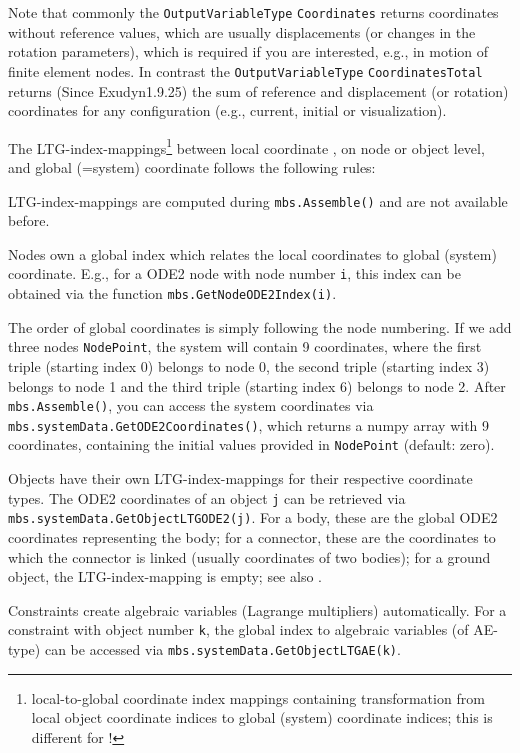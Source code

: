 Note that commonly the \texttt{OutputVariableType} \texttt{Coordinates} returns coordinates without reference values, which are usually displacements (or changes in the rotation parameters), which is required if you are interested, e.g., in motion of finite element nodes.
In contrast the \texttt{OutputVariableType} \texttt{CoordinatesTotal} returns (Since Exudyn1.9.25) the sum of reference and displacement (or rotation) coordinates for any configuration (e.g., current, initial or visualization).

%
The \ac{LTG}-index-mappings\footnote{local-to-global coordinate index mappings containing transformation from local object coordinate indices to global (system) coordinate indices; this is different for !} between local coordinate , on node or object level, and global (=system) coordinate  follows the following rules:
\bi
\item \ac{LTG}-index-mappings are computed during \texttt{mbs.Assemble()} and are not available before.
\item Nodes own a global index which relates the local coordinates to global (system) coordinate. E.g., for a \ac{ODE2} node with node number \texttt{i}, this index can be obtained via the function \texttt{mbs.GetNodeODE2Index(i)}.
\item The order of global coordinates is simply following the node numbering. If we add three nodes \texttt{NodePoint}, the system will contain 9 coordinates, where the first triple (starting index 0) belongs to node 0, the second triple (starting index 3) belongs to node 1 and the third triple (starting index 6) belongs to node 2. After \texttt{mbs.Assemble()}, you can access the system coordinates via \texttt{mbs.systemData.GetODE2Coordinates()}, which returns a numpy array with 9 coordinates, containing the initial values provided in \texttt{NodePoint} (default: zero).
\item Objects have their own \ac{LTG}-index-mappings for their respective coordinate types. The \ac{ODE2} coordinates of an object \texttt{j} can be retrieved via \texttt{mbs.systemData.GetObjectLTGODE2(j)}. For a body, these are the global \ac{ODE2} coordinates representing the body; for a connector, these are the coordinates to which the connector is linked (usually coordinates of two bodies); for a ground object, the \ac{LTG}-index-mapping is empty; see also .
\item Constraints create algebraic variables (Lagrange multipliers) automatically. For a constraint with object number \texttt{k}, the global index to algebraic variables (of \ac{AE}-type) can be accessed via \texttt{mbs.systemData.GetObjectLTGAE(k)}.
\ei

